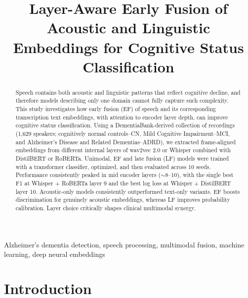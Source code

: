 \documentclass{article}
\title{Layer-Aware Early Fusion of Acoustic and Linguistic Embeddings for Cognitive Status Classification}
\begin{document}
%
\maketitle
%
{

\ninept
\fontsize{9.5pt}{12pt}\selectfont

% 
\begin{abstract}
Speech contains both acoustic and linguistic patterns that reflect cognitive decline, and therefore models describing only one domain cannot fully capture such complexity. This study investigates how early fusion (EF) of speech and its corresponding transcription text embeddings, with attention to encoder layer depth, can improve cognitive status classification. Using a DementiaBank-derived collection of recordings (1,629 speakers; cognitively normal controls--CN, Mild Cognitive Impairment--MCI, and Alzheimer’s Disease and Related Dementias--ADRD), we extracted frame-aligned embeddings from different internal layers of wav2vec 2.0 or Whisper combined with DistilBERT or RoBERTa. Unimodal, EF and late fusion (LF) models were trained with a transformer classifier, optimized, and then evaluated across 10 seeds. Performance consistently peaked in mid encoder layers ($\sim$8--10), with the single best F1 at Whisper + RoBERTa layer 9 and the best log loss at Whisper + DistilBERT layer 10. Acoustic-only models consistently outperformed text-only variants. EF boosts discrimination for genuinely acoustic embeddings, whereas LF improves probability calibration. Layer choice critically shapes clinical multimodal synergy.

\end{abstract}
%
\begin{keywords}
Alzheimer's dementia detection, speech processing, multimodal fusion, machine learning, deep neural embeddings
\end{keywords}
%
\section{Introduction}
\label{sec:intro}






}
\end{document}
